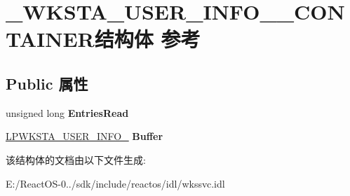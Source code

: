 \hypertarget{struct___w_k_s_t_a___u_s_e_r___i_n_f_o__1___c_o_n_t_a_i_n_e_r}{}\section{\+\_\+\+W\+K\+S\+T\+A\+\_\+\+U\+S\+E\+R\+\_\+\+I\+N\+F\+O\+\_\+\_\+\+C\+O\+N\+T\+A\+I\+N\+E\+R结构体 参考}
\label{struct___w_k_s_t_a___u_s_e_r___i_n_f_o__1___c_o_n_t_a_i_n_e_r}
\subsection*{Public 属性}
\begin{DoxyCompactItemize}
\item 
\mbox{\label{struct___w_k_s_t_a___u_s_e_r___i_n_f_o__1___c_o_n_t_a_i_n_e_r_a4ef8aee5bafb21b02ba54f72ea937f8d}} 
unsigned long {\bfseries Entries\+Read}
\item 
\mbox{\label{struct___w_k_s_t_a___u_s_e_r___i_n_f_o__1___c_o_n_t_a_i_n_e_r_a894ee946efd6783cd773ad7c68d28f52}} 
\hyperlink{struct___w_k_s_t_a___u_s_e_r___i_n_f_o__1}{L\+P\+W\+K\+S\+T\+A\+\_\+\+U\+S\+E\+R\+\_\+\+I\+N\+F\+O\+\_} {\bfseries Buffer}
\end{DoxyCompactItemize}


该结构体的文档由以下文件生成\+:\begin{DoxyCompactItemize}
\item 
E\+:/\+React\+O\+S-\/0../sdk/include/reactos/idl/wkssvc.\+idl\end{DoxyCompactItemize}
